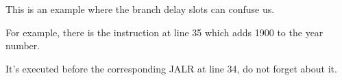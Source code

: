 


This is an example where the branch delay slots can confuse us.

For example, there is the instruction  at line 35 which adds 1900 to the year number.

It's executed before the corresponding JALR at line 34, do not forget about it.

